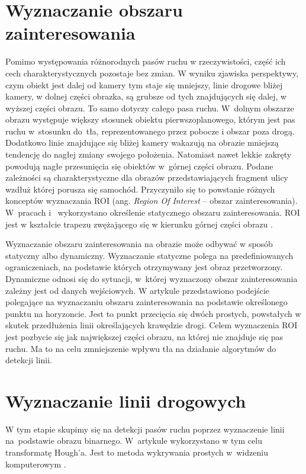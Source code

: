 \section{Wyznaczanie obszaru zainteresowania}
Pomimo występowania różnorodnych pasów ruchu w rzeczywistości, część ich cech charakterystycznych pozostaje bez zmian.
W wyniku zjawiska perspektywy, czym obiekt jest dalej od kamery tym staje się mniejszy, linie drogowe bliżej kamery, w dolnej części obrazka, są grubsze od tych znajdujących się dalej, w wyższej części obrazu.
To samo dotyczy całego pasa ruchu. W~dolnym obszarze obrazu występuje większy stosunek obiektu pierwszoplanowego, którym jest pas ruchu w~stosunku do~tła, reprezentowanego przez pobocze i obszar poza drogą.
Dodatkowo linie znajdujące się bliżej kamery wakazują na obrazie mniejszą tendencję do nagłej zmiany swojego położenia.
Natomiast nawet lekkie zakręty powodują nagłe przesunięcia się obiektów w~górnej części obrazu.
Podane zależności są charakterystyczne dla obrazów przedstawiających fragment ulicy wzdłuż której porusza się samochód.
Przyczyniło się to powstanie różnych konceptów wyznaczania ROI (ang. \textit{Region Of Interest} -- obszar zainteresowania).
W~pracach \cite{2} i~\cite{4} wykorzystano określenie statycznego obszaru zainteresowania.
ROI jest w kształcie trapezu zwężającego się w kierunku górnej części obrazu \cite{4}.

Wyznaczanie obszaru zainteresowania na obrazie może odbywać w sposób statyczny albo dynamiczny. 
Wyznaczanie statyczne polega na predefiniowanych ograniczeniach, na podstawie których otrzymywany jest obraz przetworzony. 
Dynamiczne odnosi się do sytuacji, w~której wyznaczony obszar zainteresowania zależny jest od danych wejściowych. 
W artykule \cite{vanishing_point} przedstawiono podejście polegające na wyznaczaniu obszaru zainteresowania na podstawie określonego punktu na horyzoncie.
Jest to punkt przecięcia się dwóch prostych, powstałych w skutek przedłużenia linii określających krawędzie drogi. 
Celem wyznaczenia ROI jest pozbycie się jak największej części obrazu, na której nie znajduje się pas ruchu.
Ma to na celu zmniejszenie wpływu tła na działanie algorytmów do detekcji linii.

\section{Wyznaczanie linii drogowych}
W tym etapie skupimy się na detekcji pasów ruchu poprzez wyznaczenie linii na~podstawie obrazu binarnego. 
W~artykule \cite{reichenbach_comparison} wykorzystano w tym celu transformatę Hough'a. 
Jest to metoda wykrywania prostych w~widzeniu komputerowym \cite{hough}.

